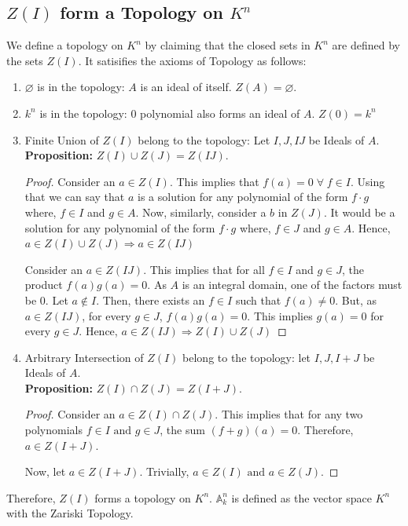 \documentclass[12pt, oneside]{book}
\begin{document}
\subsection{\(Z(I)\) form a Topology on \(K^n\)}
We define a topology on \(K^n\) by claiming that the closed sets in \(K^n\) are defined by the sets \(Z(I)\).
It satisifies the axioms of Topology as follows:
\begin{enumerate}
    \item \(\varnothing\) is in the topology: \(A\) is an ideal of itself.
        \(Z(A) = \varnothing\).
    \item \(k^n\) is in the topology: \(0\) polynomial also forms an ideal of \(A\).
        \(Z(0) = k^n\)
    \item Finite Union of \(Z(I)\) belong to the topology: Let \(I,J,IJ\) be Ideals of \(A\).\\[12pt]
        \textbf{Proposition:} \(Z(I) \cup Z(J) = Z(IJ)\).
        \begin{proof} Consider an \(a \in Z(I)\).
            This implies that \(f(a) = 0 \; \forall \; f \in I\).
            Using that we can say that \(a\) is a solution for any polynomial of the form \(f \cdot g\) where, \(f \in I\) and \(g \in A\).
            Now, similarly, consider a \(b\) in \(Z(J)\).
            It would be a solution for any polynomial of the form \(f \cdot g\) where, \(f \in J\) and \(g \in A\).
            Hence, \(a \in Z(I) \cup Z(J) \Rightarrow a \in Z(IJ)\)

            Consider an \(a \in Z(IJ)\).
            This implies that for all \(f \in I\) and \(g \in J\), the product \(f(a)g(a) = 0\).
            As \(A\) is an integral domain, one of the factors must be \(0\).
            Let \(a \notin I\).
            Then, there exists an \(f \in I\) such that \(f(a) \neq 0\).
            But, as \(a \in Z(IJ)\), for every \(g \in J\), \(f(a)g(a) = 0\).
            This implies \(g(a) = 0\) for every \(g \in J\).
            Hence, \(a \in Z(IJ) \Rightarrow Z(I) \cup Z(J) \)
        \end{proof}
    \item Arbitrary Intersection of \(Z(I)\) belong to the topology: let \(I, J, I+J\) be Ideals of \(A\).\\[12pt]
        \textbf{Proposition:} \(Z(I) \cap Z(J) = Z(I + J)\).
        \begin{proof} Consider an \(a \in Z(I) \cap Z(J)\).
            This implies that for any two polynomials \(f \in I \text{ and } g \in J\), the sum \((f + g)(a) = 0\).
            Therefore, \(a \in Z(I + J)\).

            Now, let \(a \in Z(I +J)\).
            Trivially, \(a \in Z(I) \text{ and } a \in Z(J)\).
        \end{proof}
\end{enumerate}
Therefore, \(Z(I)\) forms a topology on \(K^n\).
\(\mathbb{A}_k^n\) is defined as the vector space \(K^n\) with the Zariski Topology.
\end{document}
